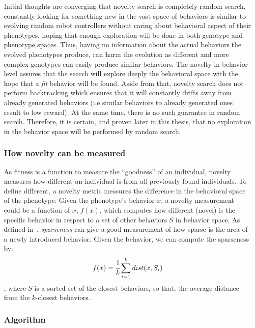 Initial thoughts are converging that novelty search is completely random search, constantly looking for something new in the vast space of behaviors is similar to evolving random robot controllers without caring about behavioral aspect of their phenotypes, hoping that enough exploration will be done in both genotype and phenotype spaces. Thus, having no information about the actual behaviors the evolved phenotypes produce, can harm the evolution as different and more complex genotypes can easily produce similar behaviors. The novelty in behavior level assures that the search will explore deeply the behavioral space with the hope that a \emph{fit} behavior will be found. Aside from that, novelty search does not perform backtracking which ensures that it will constantly drifts away from already generated behaviors (i.e similar behaviors to already generated ones result to low reward). At the same time, there is no such guarantee in random search. Therefore, it is certain, and proven later in this thesis, that no exploration in the behavior space will be performed by random search.



\subsubsection*{How novelty can be measured}

As fitness is a function to measure the ``goodness'' of an individual, novelty measures how different an individual is from all previously found individuals. To define different, a novelty metric measures the difference in the behavioral space of the phenotype. Given the phenotype's behavior $x$, a novelty measurement could be a function of $x$, $f(x)$, which computes how different (novel) is the specific behavior in respect to a set of other behaviors $S$ in behavior space.  As defined in~\citep{lehman2008exploiting,lehman2011abandoning}, \emph{sparseness} can give a good measurement of how sparse is the area of a newly introduced behavior. Given the behavior, we can compute the sparseness by:
\begin{equation}
\label{sparsenessEquation}
f(x) = \cfrac{1}{k} \sum_{i=1}^{k} dist(x, S_i)
\end{equation}
, where $S$ is a sorted set of the closest behaviors, so that, the average distance from the $k$-closest behaviors.


\subsubsection*{Algorithm}

